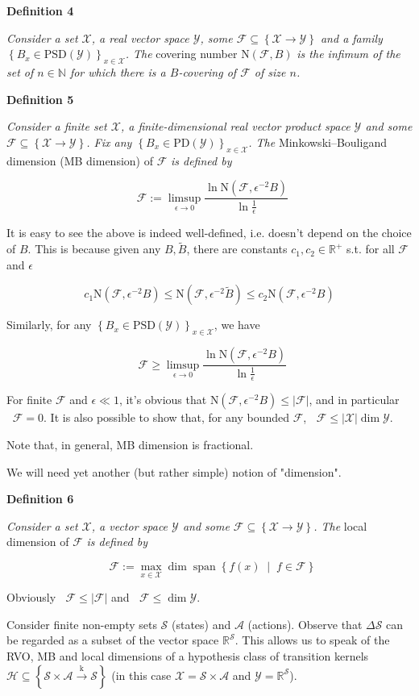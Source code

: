 \documentclass[a4paper]{article}
\newcommand{\Co}[1]{}
\DeclareMathOperator{\Sp}{span}
\newcommand{\AP}[1]{\left(#1\right)}
\newcommand{\AC}[1]{\left\{#1\right\}}
\newcommand{\ACM}[2]{\left\{#1\;\middle\vert\;#2\right\}}
\newcommand{\Nats}{\mathbb{N}}
\newcommand{\Reals}{\mathbb{R}}
\newcommand{\PD}{\mathrm{PD}}
\newcommand{\PSD}{\mathrm{PSD}}
\newcommand{\Abs}[1]{\left\vert #1 \right\vert}
\newcommand{\K}{\xrightarrow{\mathrm{k}}}
\newcommand{\B}{B}
\newcommand{\X}{\mathcal{X}}
\newcommand{\Y}{\mathcal{Y}}
\newcommand{\F}{\mathcal{F}}
\newcommand{\St}{\mathcal{S}}
\newcommand{\A}{\mathcal{A}}
\newcommand{\Hy}{\mathcal{H}}
\DeclareMathOperator{\MB}{\dim_{MB}}
\DeclareMathOperator{\LD}{\dim_{loc}}
\newcommand{\N}{\mathrm{N}}
\begin{document}
\textbf{Definition 4}\Co{b}

\textit{Consider a set $\X$, a real vector space $\Y$, some $\F\subseteq\AC{\X\rightarrow\Y}$ and a family $\AC{\B _x\in\PSD(\Y)}_{x\in\X}$. The}\Co{i} covering number $\N(\F,\B )$ \textit{is the infimum of the set of $n\in\Nats$ for which there is a $\B $-covering of $\F$ of size $n$.}\Co{i}

\textbf{Definition 5}\Co{b}

\textit{Consider a finite set $\X$, a finite-dimensional real vector product space $\Y$ and some $\F\subseteq\AC{\X\rightarrow\Y}$. Fix any $\AC{\B_x \in\PD(\Y)}_{x\in\X}$.  The}\Co{i} Minkowski–Bouligand dimension (MB dimension) of $\F$ \textit{is defined by}\Co{i}

$$\MB{\F}:=\limsup_{\epsilon \rightarrow 0}{\frac{\ln{\N\AP{\F,\epsilon^{-2} \B }}}{\ln\frac{1}{\epsilon}}}$$

It is easy to see the above is indeed well-defined, i.e. doesn't depend on the choice of $\B $. This is because given any $\B ,\tilde{\B }$, there are constants $c_1,c_2\in\Reals^+$ s.t. for all $\F$ and $\epsilon$

$$c_1 \N\AP{\F,\epsilon^{-2} \B } \leq \N\AP{\F,\epsilon^{-2} \tilde{\B }} \leq c_2\N\AP{\F,\epsilon^{-2} \B }$$

Similarly, for any $\AC{B_x\in\PSD(\Y)}_{x\in\X}$, we have

$$\MB{\F}\geq\limsup_{\epsilon \rightarrow 0}{\frac{\ln{\N\AP{\F,\epsilon^{-2} \B }}}{\ln\frac{1}{\epsilon}}}$$

For finite $\F$ and $\epsilon\ll1$, it's obvious that $\N\AP{\F,\epsilon^{-2}\B }\leq\Abs{\F}$, and in particular $\MB\F=0$. It is also possible to show that, for any bounded $\F$, $\MB{\F}\leq\Abs{\X}\dim{\Y}$.

Note that, in general, MB dimension is fractional.

We will need yet another (but rather simple) notion of "dimension".

\textbf{Definition 6}\Co{b}

\textit{Consider a set $\X$, a vector space $\Y$ and some $\F\subseteq\AC{\X\rightarrow\Y}$. The}\Co{i} local dimension of $\F$ \textit{is defined by}\Co{i}

$$\LD{\F}:=\max_{x\in\X}{\dim\Sp\ACM{f(x)}{f\in\F}}$$

Obviously $\LD{\F}\leq\Abs{\F}$ and $\LD{\F}\leq\dim{\Y}$.

Consider finite non-empty sets $\St$ (states) and $\A$ (actions). Observe that $\Delta\St$ can be regarded as a subset of the vector space $\Reals^\St$. This allows us to speak of the RVO, MB and local dimensions of a hypothesis class of transition kernels $\Hy\subseteq\AC{\St\times\A\K\St}$ (in this case $\X=\St\times\A$ and $\Y=\Reals^\St$). 
\end{document}
